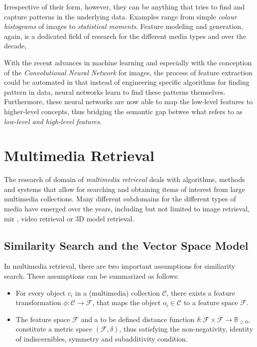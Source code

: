Irrespective of their form, however, they can be anything that tries to find and capture patterns in the underlying data. Examples range from simple \emph{colour histograms} of images to \emph{statistical moments}. Feature modeling and generation, again, is a dedicated field of research for the different media types and over the decade, 


With the recent advances in machine learning and especially with the conception of the \emph{Convolutional Neural Network} for images, the process of feature extraction could be automated in that instead of engineering specific algorithms for finding pattern in data, neural networks learn to find these patterns themselves. Furthermore, these neural networks are now able to map the low-level features to higher-level concepts, thus bridging the semantic gap betwee what \cite{Blanken:2007multimedia} refers to as \emph{low-level and high-level features}.

\section{Multimedia Retrieval}

The research of domain of \emph{multimedia retrieval} deals with algorithms, methods and systems that allow for searching and obtaining items of interest from large multimedia collections. Many different subdomains for the different types of media have emerged over the years, including but not limited to image retrieval, \acrfull{mir} \cite{Simonetta:2019Multimodal}, video retrieval or 3D model retrieval.

\subsection{Similarity Search and the Vector Space Model}

In multimedia retrieval, there are two important assumptions for similiarity search. These assumptions can be summarized as follows:

\begin{itemize}
    \item For every object $c_{i}$ in a (multimedia) collection $\mathcal{C}$, there exists a feature transformation $\phi \colon \mathcal{C} \to \mathcal{F}$, that maps the object $o_{i} \in \mathcal{C}$ to a feature space $\mathcal{F}$.
    \item The feature space $\mathcal{F}$ and a to be defined distance function $\delta \colon \mathcal{F} \times \mathcal{F} \to \mathbb{R}_{\geq 0}$, constitute a metric space $(\mathcal{F},\delta)$, thus satisfying the non-negativity, identity of indiscernibles, symmetry and subadditivity condition.
\end{itemize}

